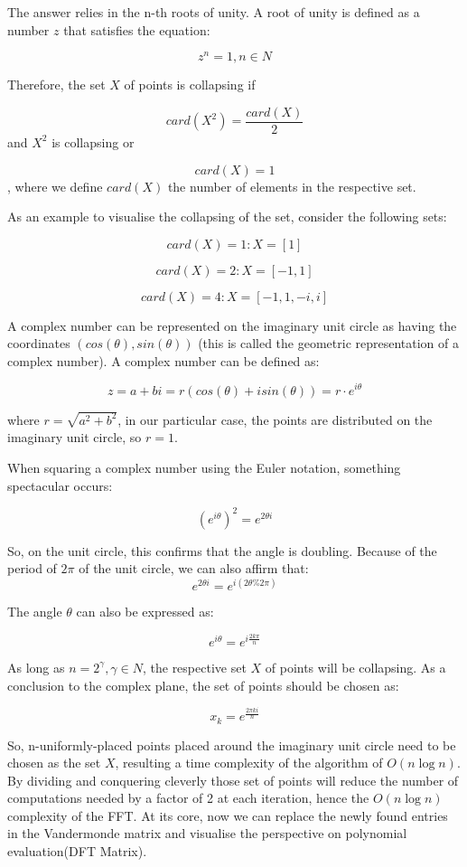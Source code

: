 \documentclass[letterpaper]{article}
\begin{document}
The answer relies in the n-th roots of unity. A root of unity is defined as a number $z$ that satisfies the equation:

$$
z^{n} = 1, n \in {N}
$$

Therefore, the set $X$ of points is collapsing if 

$$
card(X^2) = \frac{card(X)}{2}
$$ 
and $X^2$ is collapsing or 

$$
card(X) = 1
$$
, where we define $card(X)$ the number of elements in the respective set.

As an example to visualise the collapsing of the set, consider the following sets:

$$
card(X) = 1 : X = [1]
$$

$$
card(X) = 2 : X = [-1, 1]
$$

$$
card(X) = 4 : X = [-1, 1, -i, i]
$$

A complex number can be represented on the imaginary unit circle as having the coordinates $(cos(\theta), sin(\theta))$ (this is called the geometric representation of a complex number). A complex number can be defined as:

$$
z = a + bi = r(cos(\theta) + isin(\theta)) = r \cdot e^{i\theta}
$$

where $r = \sqrt{a^2 + b^2}$, in our particular case, the points are distributed on the imaginary unit circle, so $r = 1$.

When squaring a complex number using the Euler notation, something spectacular occurs:

$$
(e^{i\theta})^2 = e^{2\theta i}
$$

So, on the unit circle, this confirms that the angle is doubling. Because of the period of $2\pi$ of the unit circle, we can also affirm that:
$$
e^{2\theta i} = e^{i (2\theta \% 2\pi)}
$$

The angle $\theta$ can also be expressed as:

$$
e^{i\theta} = e^{i \frac{2k\pi}{n}}
$$

As long as $n = 2^{\gamma}, \gamma \in {N}$, the respective set $X$ of points will be collapsing. As a conclusion to the complex plane, the set of points should be chosen as:

$$
x_{k} = e^{\frac{2\pi k i}{n}}
$$

So, n-uniformly-placed points placed around the imaginary unit circle need to be chosen as the set $X$, resulting a time complexity of the algorithm of $O(n \log n)$. By dividing and conquering cleverly those set of points will reduce the number of computations needed by a factor of 2 at each iteration, hence the $O(n \log n)$ complexity of the FFT. At its core, now we can replace the newly found entries in the Vandermonde matrix and visualise the perspective on polynomial evaluation(DFT Matrix).
\end{document}
